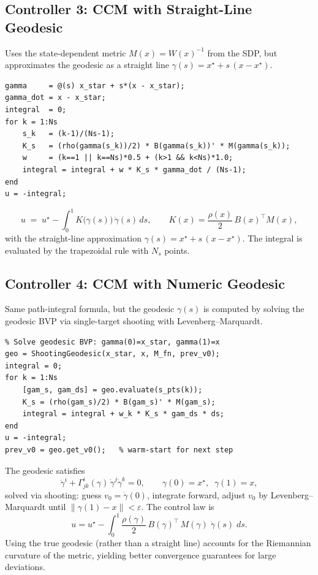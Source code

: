 \documentclass[11pt,a4paper]{article}
\begin{document}
\subsection{Controller 3: CCM with Straight-Line Geodesic}

Uses the state-dependent metric \(M(x) = W(x)^{-1}\) from the SDP, but approximates the geodesic as a straight line \(\gamma(s) = x^\star + s\,(x - x^\star)\).

\begin{lstlisting}
gamma     = @(s) x_star + s*(x - x_star);
gamma_dot = x - x_star;
integral  = 0;
for k = 1:Ns
    s_k   = (k-1)/(Ns-1);
    K_s   = (rho(gamma(s_k))/2) * B(gamma(s_k))' * M(gamma(s_k));
    w     = (k==1 || k==Ns)*0.5 + (k>1 && k<Ns)*1.0;
    integral = integral + w * K_s * gamma_dot / (Ns-1);
end
u = -integral;
\end{lstlisting}

\begin{codemath}
\[
u \;=\; u^\star - \int_0^1 K\bigl(\gamma(s)\bigr)\,\dot\gamma(s)\,ds,
\qquad
K(x) = \frac{\rho(x)}{2}\,B(x)^\top M(x),
\]
with the straight-line approximation \(\gamma(s) = x^\star + s\,(x - x^\star)\).
The integral is evaluated by the trapezoidal rule with \(N_s\) points.
\end{codemath}

\subsection{Controller 4: CCM with Numeric Geodesic}

Same path-integral formula, but the geodesic \(\gamma(s)\) is computed by solving the geodesic BVP via single-target shooting with Levenberg--Marquardt.

\begin{lstlisting}
% Solve geodesic BVP: gamma(0)=x_star, gamma(1)=x
geo = ShootingGeodesic(x_star, x, M_fn, prev_v0);
integral = 0;
for k = 1:Ns
    [gam_s, gam_ds] = geo.evaluate(s_pts(k));
    K_s = (rho(gam_s)/2) * B(gam_s)' * M(gam_s);
    integral = integral + w_k * K_s * gam_ds * ds;
end
u = -integral;
prev_v0 = geo.get_v0();   % warm-start for next step
\end{lstlisting}

\begin{codemath}
The geodesic satisfies
\[
\ddot\gamma^i + \Gamma^i_{jk}(\gamma)\,\dot\gamma^j\dot\gamma^k = 0,
\qquad \gamma(0) = x^\star,\;\; \gamma(1) = x,
\]
solved via shooting: guess \(v_0 = \dot\gamma(0)\), integrate forward, adjust \(v_0\) by Levenberg--Marquardt until \(\|\gamma(1) - x\| < \varepsilon\).
The control law is
\[
u = u^\star - \int_0^1 \frac{\rho(\gamma)}{2}\,B(\gamma)^\top\,M(\gamma)\;\dot\gamma(s)\;ds.
\]
Using the true geodesic (rather than a straight line) accounts for the Riemannian curvature of the metric, yielding better convergence guarantees for large deviations.
\end{codemath}
\end{document}
